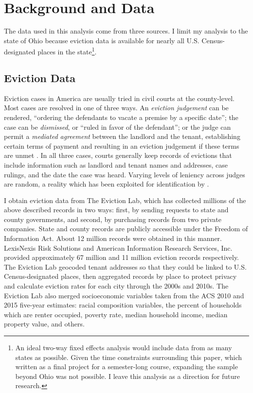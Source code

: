 \documentclass[12pt]{article}
\begin{document}
\section{Background and Data} \label{sec:data}
The data used in this analysis come from three sources. I limit my analysis to the state of Ohio because eviction data is available for nearly all U.S. Census-designated places in the state\footnote{An ideal two-way fixed effects analysis would include data from as many states as possible. Given the time constraints surrounding this paper, which written as a final project for a semester-long course, expanding the sample beyond Ohio was not possible. I leave this analysis as a direction for future research.}. 
\subsection{Eviction Data}
Eviction cases in America are usually tried in civil courts at the county-level. Most cases are resolved in one of three ways. An \textit{eviction judgement} can be rendered, ``ordering the defendants to vacate a premise by a specific date''; the case can be \textit{dismissed}, or ``ruled in favor of the defendant''; or the judge can permit a \textit{mediated agreement} between the landlord and the tenant, establishing certain terms of payment and resulting in an eviction judgement if these terms are unmet \citep{desmond_eviction_2018}. In all three cases, courts generally keep records of evictions that include information such as landlord and tenant names and addresses, case rulings, and the date the case was heard. Varying levels of leniency across judges are random, a reality which has been exploited for identification by \cite{humphries_does_2019}.

I obtain eviction data from The Eviction Lab, which has collected millions of the above described records in two ways: first, by sending requests to state and county governments, and second, by purchasing records from two private companies. State and county records are publicly accessible under the Freedom of Information Act. About 12 million records were obtained in this manner. LexisNexis Risk Solutions and American Information Research Services, Inc. provided approximately 67 million and 11 million eviction records respectively. The Eviction Lab geocoded tenant addresses so that they could be linked to U.S. Census-designated places, then aggregated records by place to protect privacy and calculate eviction rates for each city through the 2000s and 2010s. The Eviction Lab also merged socioeconomic variables taken from the ACS 2010 and 2015 five-year estimates: racial composition variables, the percent of households which are renter occupied, poverty rate, median household income, median property value, and others.
\end{document}
